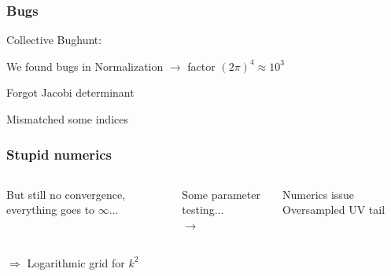 \begin{frame}\frametitle{Bugs}
  {\Large Collective Bughunt:}


  {\small

    \pause
    \vspace{3mm}
    We found bugs in Normalization $\rightarrow$ factor $(2\pi)^4 \approx 10^3$

    \pause
    \vspace{3mm}
    Forgot Jacobi determinant

    \pause
    \vspace{3mm}
    Mismatched some indices
  }
\end{frame}

\begin{frame}\frametitle{Stupid numerics}
  \begin{columns}
    \centering
    \begin{column}{0.4\linewidth}
      \begin{block}{}
        \vspace{-0.cm}
        But still no convergence, everything goes to $\infty$...
      \end{block}
    \end{column}
    \pause
    \begin{column}{0.2\linewidth}
      \centering
      {\tiny
        Some parameter testing...\\
      }
      $\rightarrow$
    \end{column}
    \pause
    \begin{column}{0.4\linewidth}
      \begin{block}{Numerics issue}
        \vspace{-0.cm}
          Oversampled UV tail
      \end{block}
    \end{column}
  \end{columns}
  \pause
  \vspace{1cm}
  \centering
  $\Rightarrow$ Logarithmic grid for $k^2$
\end{frame}

